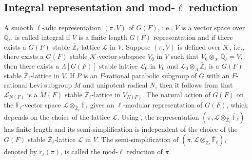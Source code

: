\documentclass[10pt, reqno]{amsart}
\theoremstyle{plain}
\numberwithin{equation}{section} \newcommand{\di}{\operatorname{dim}}
\begin{document}
\subsection{Integral representation and mod-\texorpdfstring{$\ell$}{}
reduction}
A smooth $\ell$-adic representation $(\pi,V)$ of $G(F)$, i.e., $V$ is
a vector space over $\overline{\mathbb{Q}}_\ell$, is called integral
if $V$ is a finite length $G(F)$ representation and if there exists a
$G(F)$ stable $\overline{\mathbb{Z}}_\ell$-lattice $\mathcal{L}$ in
$V$. Suppose $(\pi,V)$ is defined over $\mathcal{K}$, i.e., there
exists a $G(F)$ stable $\mathcal{K}$-vector subspace $V_0$ in $V$ such
that $V_0\otimes_{\mathcal{K}} \overline{\mathbb{Q}}_\ell = V$, then
there exists a $\Lambda[G(F)]$ stable lattice $\mathcal{L}_0$ in $V_0$
and $\mathcal{L}_0 \otimes_{\Lambda}\overline{\mathbb{Z}}_\ell$ is a
$G(F)$ stable $\overline {\mathbb{Z}}_\ell$-lattice in $V$.  If $P$ is
an $F$-rational parabolic subgroup of $G$ with an $F$-rational Levi
subgroup $M$ and unipotent radical $N$, then it follows from
\cite[Proposition 1.4]{Dat_tempered} that $\mathcal{L}_{N(F)}$ is a
$M(F)$ stable $\overline {\mathbb{Z}}_\ell$-lattice in $V_{N(F)}$.
The natural action of $G(F)$ on the
$\overline{\mathbb{F}}_\ell$-vector space
$\mathcal{L}\otimes_{\overline{\mathbb{Z}}_\ell}
\overline{\mathbb{F}}_\ell$ gives an $\ell$-modular representation of
$G(F)$, which depends on the choice of the lattice
$\mathcal{L}$. Using \cite[Chapter II, 5.11.a and
5.11.b]{Vigneras_modl_book}, the representation
$(\pi,\mathcal{L}\otimes_ {\overline{\mathbb{Z}}_\ell}
\overline{\mathbb{F}}_\ell)$ has finite length and its
semi-simplification is independent of the choice of the $G(F)$ stable
$\overline{\mathbb{Z}}_\ell$-lattice $\mathcal{L}$ in $V$. The
semi-simplification of
$(\pi, \mathcal{L}\otimes_{\overline{\mathbb{Z}}_\ell}
\overline{\mathbb{F}}_\ell)$, denoted by $r_\ell(\pi)$, is called the
mod-$\ell$ reduction of $\pi$.
\end{document}
